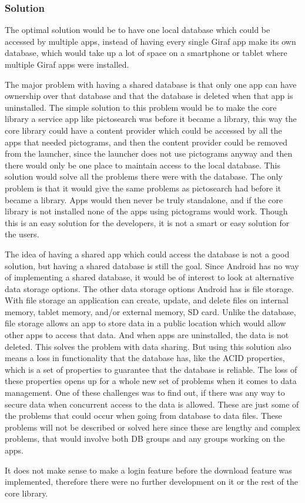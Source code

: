\subsubsection{Solution}
The optimal solution would be to have one local database which could be accessed by multiple apps, instead of having every single Giraf app make its own database, which would take up a lot of space on a smartphone or tablet where multiple Giraf apps were installed.

The major problem with having a shared database is that only one app can have ownership over that database and that the database is deleted when that app is uninstalled. The simple solution to this problem would be to make the core library a service app like pictosearch was before it became a library, this way the core library could have a content provider which could be accessed by all the apps that needed pictograms, and then the content provider could be removed from the launcher, since the launcher does not use pictograms anyway and then there would only be one place to maintain access to the local database. 
This solution would solve all the problems there were with the database. The only problem is that it would give the same problems as pictosearch had before it became a library. Apps would then never be truly standalone, and if the core library is not installed none of the apps using pictograms would work. Though this is an easy solution for the developers, it is not a smart or easy solution for the users.

The idea of having a shared app which could access the database is not a good solution, but having a shared database is still the goal. Since Android has no way of implementing a shared database, it would be of interest to look at alternative data storage options. The other data storage options Android has is file storage. With file storage an application can create, update, and delete files on internal memory, tablet memory, and/or external memory, SD card. Unlike the database, file storage allows an app to store data in a public location which would allow other apps to access that data. And when apps are uninstalled, the data is not deleted. This solves the problem with data sharing. But using this solution also means a loss in functionality that the database has, like the ACID properties, which is a set of properties to guarantee that the database is reliable. The loss of these properties opens up for a whole new set of problems when it comes to data management. One of these challenges was to find out, if there was any way to secure data when concurrent access to the data is allowed. These are just some of the problems that could occur when going from database to data files.
These problems will not be described or solved here since these are lengthy and complex problems, that would involve both DB groups and any groups working on the apps. 

It does not make sense to make a login feature before the download feature was implemented, therefore there were no further development on it or the rest of the core library.

